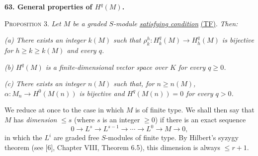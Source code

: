 
\label{fac:III:3:no:63}
\textbf{63. General properties of $H^q(M)$.}

\label{fac:III:3:no:63:prop:3}
\textsc{Proposition 3.} \textit{Let $M$ be a graded $S$-module
\hyperref[fac:III:2:no:56:def:TF]{satisfying condition}}
\hyperref[fac:III:2:no:56:def:TF]{(TF)}. \textit{Then:}

\label{fac:III:3:no:63:prop:3:item:a}
\textit{(a) There exists an integer $k(M)$ such that
$\rho_k^h:H_k^q(M)\to H_h^q(M)$ is bijective for
$h\geq k\geq k(M)$ and every $q$.}

\label{fac:III:3:no:63:prop:3:item:b}
\textit{(b) $H^q(M)$ is a finite-dimensional vector space over $K$ for
every $q\geq0$.}

\label{fac:III:3:no:63:prop:3:item:c}
\textit{(c) There exists an integer $n(M)$ such that, for $n\geq n(M)$,
$\alpha:M_n\to H^0(M(n))$ is bijective and $H^q(M(n))=0$ for every
$q>0$.}

We reduce at once to the case in which $M$ is of finite type. We shall
then say that $M$ has \emph{dimension} $\leq s$ (where $s$ is an integer
$\geq0$) if there is an exact sequence
\label{fac:III:3:no:63:def:dimension}
\[
0\longrightarrow L^s\longrightarrow L^{s-1}\longrightarrow\cdots
\longrightarrow L^0\longrightarrow M\longrightarrow0,
\]
in which the $L^i$ are graded free $S$-modules of finite type. By
Hilbert's syzygy theorem (see [6], Chapter VIII, Theorem 6.5), this
dimension is always $\leq r+1$.

